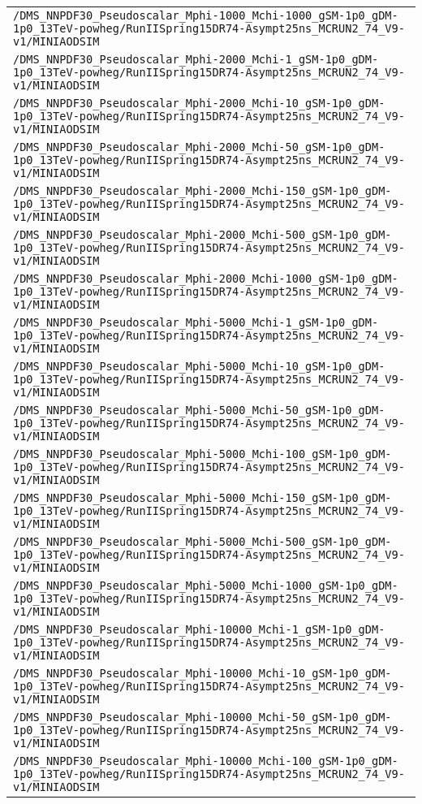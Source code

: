 \begin{center}
\begin{tabular}{l}
\verb!/DMS_NNPDF30_Pseudoscalar_Mphi-1000_Mchi-1000_gSM-1p0_gDM-1p0_13TeV-powheg/RunIISpring15DR74-Asympt25ns_MCRUN2_74_V9-v1/MINIAODSIM! \tabularnewline
\verb!/DMS_NNPDF30_Pseudoscalar_Mphi-2000_Mchi-1_gSM-1p0_gDM-1p0_13TeV-powheg/RunIISpring15DR74-Asympt25ns_MCRUN2_74_V9-v1/MINIAODSIM! \tabularnewline
\verb!/DMS_NNPDF30_Pseudoscalar_Mphi-2000_Mchi-10_gSM-1p0_gDM-1p0_13TeV-powheg/RunIISpring15DR74-Asympt25ns_MCRUN2_74_V9-v1/MINIAODSIM! \tabularnewline
\verb!/DMS_NNPDF30_Pseudoscalar_Mphi-2000_Mchi-50_gSM-1p0_gDM-1p0_13TeV-powheg/RunIISpring15DR74-Asympt25ns_MCRUN2_74_V9-v1/MINIAODSIM! \tabularnewline
\verb!/DMS_NNPDF30_Pseudoscalar_Mphi-2000_Mchi-150_gSM-1p0_gDM-1p0_13TeV-powheg/RunIISpring15DR74-Asympt25ns_MCRUN2_74_V9-v1/MINIAODSIM! \tabularnewline
\verb!/DMS_NNPDF30_Pseudoscalar_Mphi-2000_Mchi-500_gSM-1p0_gDM-1p0_13TeV-powheg/RunIISpring15DR74-Asympt25ns_MCRUN2_74_V9-v1/MINIAODSIM! \tabularnewline
\verb!/DMS_NNPDF30_Pseudoscalar_Mphi-2000_Mchi-1000_gSM-1p0_gDM-1p0_13TeV-powheg/RunIISpring15DR74-Asympt25ns_MCRUN2_74_V9-v1/MINIAODSIM! \tabularnewline
\verb!/DMS_NNPDF30_Pseudoscalar_Mphi-5000_Mchi-1_gSM-1p0_gDM-1p0_13TeV-powheg/RunIISpring15DR74-Asympt25ns_MCRUN2_74_V9-v1/MINIAODSIM! \tabularnewline
\verb!/DMS_NNPDF30_Pseudoscalar_Mphi-5000_Mchi-10_gSM-1p0_gDM-1p0_13TeV-powheg/RunIISpring15DR74-Asympt25ns_MCRUN2_74_V9-v1/MINIAODSIM! \tabularnewline
\verb!/DMS_NNPDF30_Pseudoscalar_Mphi-5000_Mchi-50_gSM-1p0_gDM-1p0_13TeV-powheg/RunIISpring15DR74-Asympt25ns_MCRUN2_74_V9-v1/MINIAODSIM! \tabularnewline
\verb!/DMS_NNPDF30_Pseudoscalar_Mphi-5000_Mchi-100_gSM-1p0_gDM-1p0_13TeV-powheg/RunIISpring15DR74-Asympt25ns_MCRUN2_74_V9-v1/MINIAODSIM! \tabularnewline
\verb!/DMS_NNPDF30_Pseudoscalar_Mphi-5000_Mchi-150_gSM-1p0_gDM-1p0_13TeV-powheg/RunIISpring15DR74-Asympt25ns_MCRUN2_74_V9-v1/MINIAODSIM! \tabularnewline
\verb!/DMS_NNPDF30_Pseudoscalar_Mphi-5000_Mchi-500_gSM-1p0_gDM-1p0_13TeV-powheg/RunIISpring15DR74-Asympt25ns_MCRUN2_74_V9-v1/MINIAODSIM! \tabularnewline
\verb!/DMS_NNPDF30_Pseudoscalar_Mphi-5000_Mchi-1000_gSM-1p0_gDM-1p0_13TeV-powheg/RunIISpring15DR74-Asympt25ns_MCRUN2_74_V9-v1/MINIAODSIM! \tabularnewline
\verb!/DMS_NNPDF30_Pseudoscalar_Mphi-10000_Mchi-1_gSM-1p0_gDM-1p0_13TeV-powheg/RunIISpring15DR74-Asympt25ns_MCRUN2_74_V9-v1/MINIAODSIM! \tabularnewline
\verb!/DMS_NNPDF30_Pseudoscalar_Mphi-10000_Mchi-10_gSM-1p0_gDM-1p0_13TeV-powheg/RunIISpring15DR74-Asympt25ns_MCRUN2_74_V9-v1/MINIAODSIM! \tabularnewline
\verb!/DMS_NNPDF30_Pseudoscalar_Mphi-10000_Mchi-50_gSM-1p0_gDM-1p0_13TeV-powheg/RunIISpring15DR74-Asympt25ns_MCRUN2_74_V9-v1/MINIAODSIM! \tabularnewline
\verb!/DMS_NNPDF30_Pseudoscalar_Mphi-10000_Mchi-100_gSM-1p0_gDM-1p0_13TeV-powheg/RunIISpring15DR74-Asympt25ns_MCRUN2_74_V9-v1/MINIAODSIM! \tabularnewline

\end{tabular}
\end{center}
